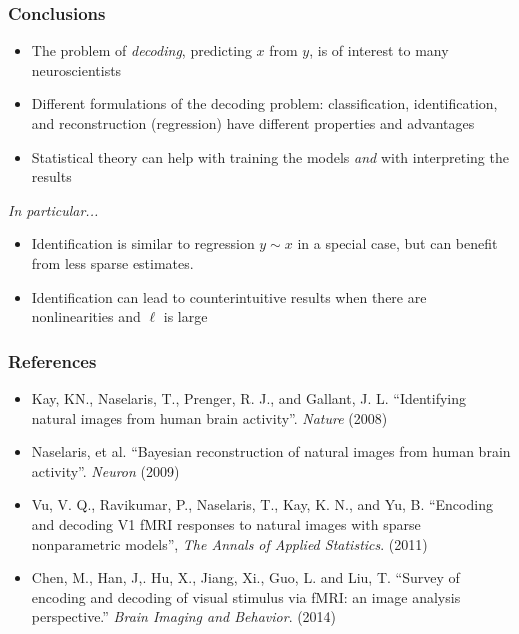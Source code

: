 \documentclass{beamer}
\begin{document}
\begin{frame}
\frametitle{Conclusions}
\begin{itemize}
\item The problem of \emph{decoding}, predicting $x$ from $y$, is of
  interest to many neuroscientists
\item Different formulations of the decoding problem: classification,
  identification, and reconstruction (regression) have different
  properties and advantages
\item Statistical theory can help with training the models \emph{and}
 with interpreting the results
\end{itemize}
\emph{In particular...}
\begin{itemize}
\item Identification is similar to regression $y \sim x$
  in a special case, but can benefit from less sparse estimates.
\item Identification can lead to counterintuitive
  results when there are nonlinearities and $\ell$ is large
\end{itemize}
\end{frame}

\begin{frame}
\frametitle{References}
\begin{itemize}
\item Kay, KN., Naselaris, T., Prenger, R. J., and Gallant, J. L.
  ``Identifying natural images from human brain
  activity''. \emph{Nature} (2008)
\item Naselaris, et al. ``Bayesian reconstruction of natural images
  from human brain activity''.  \emph{Neuron} (2009)
\item Vu, V. Q., Ravikumar, P., Naselaris, T., Kay, K. N., and Yu, B.
  ``Encoding and decoding V1 fMRI responses to natural images with
  sparse nonparametric models'', \emph{The Annals of Applied
    Statistics}. (2011)
\item Chen, M., Han, J,. Hu, X., Jiang, Xi., Guo, L. and Liu, T.
  ``Survey of encoding and decoding of visual stimulus via fMRI: an
  image analysis perspective.'' \emph{Brain Imaging and
    Behavior}. (2014)
\end{itemize}
\end{frame}
\end{document}
